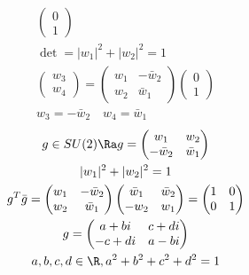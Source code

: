 \begin{gather*}
\begin{pmatrix}
        0 \\
        1
    \end{pmatrix} \\
    \det = |w_1|^2+|w_2|^2 = 1 \\
    \begin{pmatrix}
        w_3 \\
        w_4
    \end{pmatrix} = \begin{pmatrix}
        w_1 &-\bar w_2 \\
        w_2 & \bar w_1
    \end{pmatrix}\begin{pmatrix}
        0 \\
        1
    \end{pmatrix} \\
    w_3 = -\bar w_2 \quad w_4 =  \bar w_1
\end{gather*}
\begin{gather*}
    g \in SU(2) \Ra g = \begin{pmatrix}
        w_1 & w_2 \\
        -\bar w_2 & \bar w_1
    \end{pmatrix} \\
    |w_1|^2 + |w_2|^2 = 1 \\
    g^T\bar g = \begin{pmatrix}
        w_1 & -\bar w_2 \\
        w_2 &  \bar w_1
    \end{pmatrix}\begin{pmatrix}
        \bar w_1 & \bar w_2 \\
        -w_2 & w_1
    \end{pmatrix} = \begin{pmatrix}
        1 & 0 \\
        0 & 1
    \end{pmatrix} \\
    g = \begin{pmatrix}
         a + bi & c + di \\
        -c + di & a - bi
    \end{pmatrix} \\
    a, b, c, d \in \R, a^2 + b^2 + c^2 + d^2 = 1
\end{gather*}

